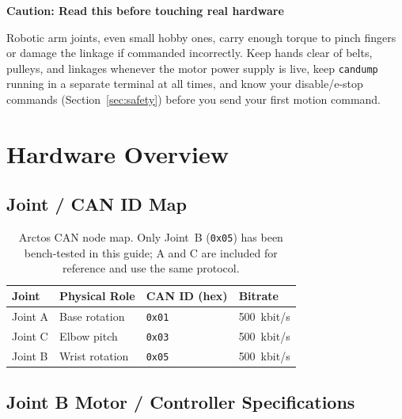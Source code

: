 \documentclass[11pt,letterpaper]{article}
\newenvironment{caution}[1]{%
    \par\addvspace{8pt}%
    \noindent{\color{cautionred}\rule{\linewidth}{0.8pt}}\par\vspace{2pt}
    \noindent\textbf{\color{cautionred}Caution: #1}\par\vspace{2pt}
}{%
    \par\vspace{2pt}\noindent{\color{cautionred}\rule{\linewidth}{0.4pt}}%
    \par\addvspace{8pt}%
}
\begin{document}
\begin{caution}{Read this before touching real hardware}
Robotic arm joints, even small hobby ones, carry enough torque to pinch fingers or damage the linkage if commanded incorrectly. Keep hands clear of belts, pulleys, and linkages whenever the motor power supply is live, keep \texttt{candump} running in a separate terminal at all times, and know your disable/e-stop commands (Section~\ref{sec:safety}) before you send your first motion command.
\end{caution}

\newpage
\section{Hardware Overview}

\subsection{Joint / CAN ID Map}

\begin{table}[h]
\centering
\begin{tabular}{llll}
\toprule
\textbf{Joint} & \textbf{Physical Role} & \textbf{CAN ID (hex)} & \textbf{Bitrate} \\ \midrule
Joint A & Base rotation & \texttt{0x01} & 500~kbit/s \\
Joint C & Elbow pitch   & \texttt{0x03} & 500~kbit/s \\
Joint B & Wrist rotation & \texttt{0x05} & 500~kbit/s \\ \bottomrule
\end{tabular}
\caption{Arctos CAN node map. Only Joint~B (\texttt{0x05}) has been bench-tested in this guide; A and C are included for reference and use the same protocol.}
\end{table}

\subsection{Joint B Motor / Controller Specifications}
\end{document}
